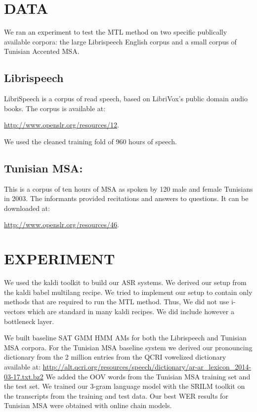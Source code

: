 \documentclass[11pt]{article}
\begin{document}
\section{DATA}
\label{sec-3}

We ran an experiment to test the \gls{MTL} method on two specific publically available corpora: the large Librispeech English corpus and a small corpus of Tunisian Accented \gls{MSA}. 



\subsection{Librispeech}
\label{sec-3-1}
LibriSpeech is a corpus of read speech, based on LibriVox's public domain audio books.
The corpus is available at:

\url{http://www.openslr.org/resources/12}.

We used the cleaned training fold of 960 hours of speech. 

\subsection{Tunisian \gls{MSA}:}
\label{sec-3-2}
This is a corpus of ten hours of \gls{MSA} as spoken by 120 male and female Tunisians in 2003. 
The informants provided recitations and answers to questions. 
It can be downloaded at:

\url{http://www.openslr.org/resources/46}.

\section{EXPERIMENT}
\label{sec-4}
We used the kaldi toolkit\cite{Povey11thekaldi} to build our ASR systems. 
We derived our setup from the kaldi babel multilang recipe. 
We tried to implement our setup to contain only methods that are required to run the \gls{MTL} method. 
Thus, We did not use i-vectors which are standard in many kaldi recipes. 
We did include however a bottleneck layer. 

We built baseline \gls{SAT} \gls{GMM} \gls{HMM} \gls{AM}s for both the Librispeech and Tunisian \gls{MSA} corpora.
For the Tunisian \gls{MSA} baseline system we derived our pronouncing dictionary from the 2 million entries from the \gls{QCRI} vowelized dictionary\cite{aaliArabicKaldi} available at:
\url{http://alt.qcri.org/resources/speech/dictionary/ar-ar_lexicon_2014-03-17.txt.bz2}
We added the \gls{OOV} words from the Tunisian \gls{MSA} training set and the test set. 
We trained our $3$-gram language model with the \gls{SRILM} toolkit\cite{Stolcke02srilm-} on the transcripts from the training and test data. 
Our best \gls{WER} results for Tunisian \gls{MSA} were obtained with online chain models.
\end{document}
